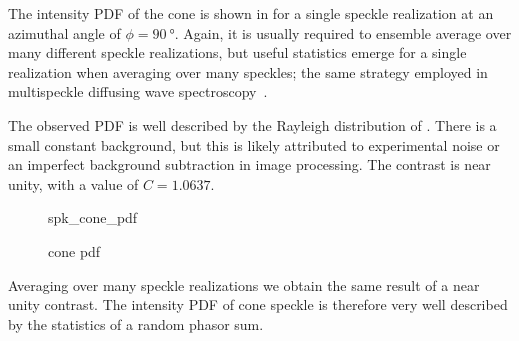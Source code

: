 The intensity PDF of the cone is shown in  for a single
speckle realization at an azimuthal angle of $\phi=\SI{90}{\degree}$.
Again, it is usually required to ensemble average over many different
speckle realizations, but useful statistics emerge for a single realization
when averaging over many speckles; the same strategy employed in
multispeckle diffusing wave spectroscopy~\cite{zakharov2006multispeckle}.

The observed PDF is well described by the Rayleigh distribution of
.  There is a small constant background, but this is
likely attributed to experimental noise or an imperfect background
subtraction in image processing.  The contrast is near unity, with a value
of $C=1.0637$. 
\begin{figure}[ht]
\centering
{spk_cone_pdf}
\caption{cone pdf}
\label{fig:conepdf}
\end{figure}

Averaging over many speckle realizations we obtain the same result of a
near unity contrast.  The intensity PDF of cone speckle is therefore very
well described by the statistics of a random phasor sum.
